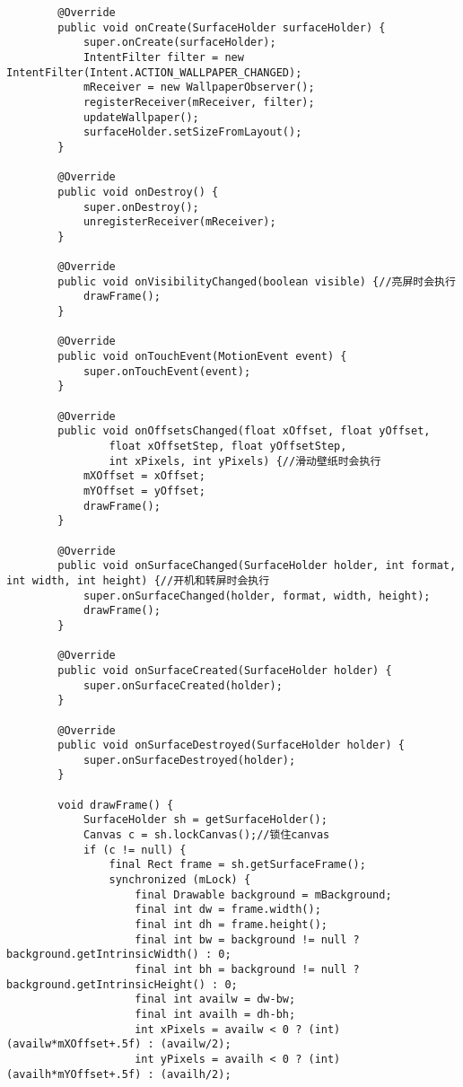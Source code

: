 \documentclass[a4paper,11pt,twoside,openany]{article}%
\begin{document}
\begin{CJK}{UTF8}{song}
\begin{verbatim}
        @Override 
        public void onCreate(SurfaceHolder surfaceHolder) { 
            super.onCreate(surfaceHolder); 
            IntentFilter filter = new IntentFilter(Intent.ACTION_WALLPAPER_CHANGED); 
            mReceiver = new WallpaperObserver(); 
            registerReceiver(mReceiver, filter); 
            updateWallpaper(); 
            surfaceHolder.setSizeFromLayout(); 
        } 

        @Override 
        public void onDestroy() { 
            super.onDestroy(); 
            unregisterReceiver(mReceiver); 
        } 

        @Override 
        public void onVisibilityChanged(boolean visible) {//亮屏时会执行 
            drawFrame(); 
        } 
        
        @Override 
        public void onTouchEvent(MotionEvent event) { 
            super.onTouchEvent(event); 
        } 

        @Override 
        public void onOffsetsChanged(float xOffset, float yOffset, 
                float xOffsetStep, float yOffsetStep, 
                int xPixels, int yPixels) {//滑动壁纸时会执行 
            mXOffset = xOffset; 
            mYOffset = yOffset; 
            drawFrame(); 
        } 

        @Override 
        public void onSurfaceChanged(SurfaceHolder holder, int format, int width, int height) {//开机和转屏时会执行 
            super.onSurfaceChanged(holder, format, width, height); 
            drawFrame(); 
        } 

        @Override 
        public void onSurfaceCreated(SurfaceHolder holder) { 
            super.onSurfaceCreated(holder); 
        } 

        @Override 
        public void onSurfaceDestroyed(SurfaceHolder holder) { 
            super.onSurfaceDestroyed(holder); 
        } 
        
        void drawFrame() { 
            SurfaceHolder sh = getSurfaceHolder(); 
            Canvas c = sh.lockCanvas();//锁住canvas 
            if (c != null) { 
                final Rect frame = sh.getSurfaceFrame(); 
                synchronized (mLock) { 
                    final Drawable background = mBackground; 
                    final int dw = frame.width(); 
                    final int dh = frame.height(); 
                    final int bw = background != null ? background.getIntrinsicWidth() : 0; 
                    final int bh = background != null ? background.getIntrinsicHeight() : 0; 
                    final int availw = dw-bw; 
                    final int availh = dh-bh; 
                    int xPixels = availw < 0 ? (int)(availw*mXOffset+.5f) : (availw/2); 
                    int yPixels = availh < 0 ? (int)(availh*mYOffset+.5f) : (availh/2); 


\end{verbatim}
\end{CJK}
\end{document}
